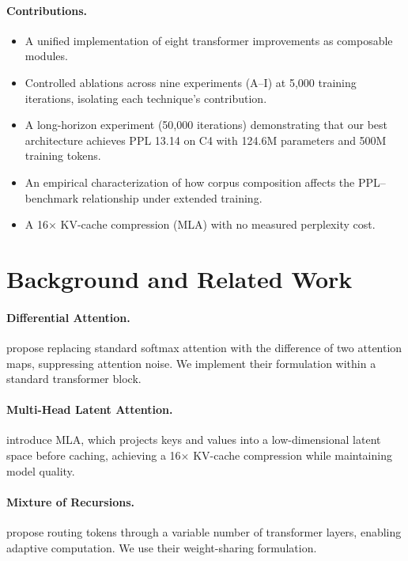 \documentclass{article}
\begin{document}
\paragraph{Contributions.}
\begin{itemize}
  \item A unified implementation of eight transformer improvements as composable modules.
  \item Controlled ablations across nine experiments (A–I) at 5{,}000 training iterations, isolating each technique's contribution.
  \item A long-horizon experiment (50{,}000 iterations) demonstrating that our best architecture achieves PPL 13.14 on C4 with 124.6M parameters and 500M training tokens.
  \item An empirical characterization of how corpus composition affects the PPL–benchmark relationship under extended training.
  \item A 16$\times$ KV-cache compression (MLA) with no measured perplexity cost.
\end{itemize}

\section{Background and Related Work}

\paragraph{Differential Attention.}
\citet{ye2025differentialattention} propose replacing standard softmax attention with the difference of two attention maps, suppressing attention noise. We implement their formulation within a standard transformer block.

\paragraph{Multi-Head Latent Attention.}
\citet{deepseekv3_2024} introduce MLA, which projects keys and values into a low-dimensional latent space before caching, achieving a 16$\times$ KV-cache compression while maintaining model quality.

\paragraph{Mixture of Recursions.}
\citet{moyle2025mixtureofrecursions} propose routing tokens through a variable number of transformer layers, enabling adaptive computation. We use their weight-sharing formulation.
\end{document}
